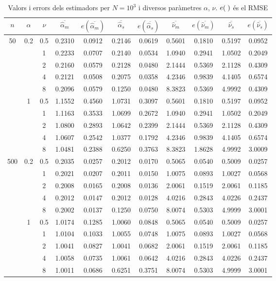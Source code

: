\documentclass[12pt, catalan]{article}
\numberwithin{table}{section}
\numberwithin{figure}{section}
\numberwithin{equation}{section}
\begin{document}
\begin{table}[h]
\centering
\caption{Valors i errors dels estimadors per $N=10^3$ i diversos paràmetres $\alpha$, $\nu$. $e(\hspace{1mm})$ és el RMSE}
\begin{tabular}{c|c|c||cc|cc||cc|cc}
$n$ & $\alpha$ & $\nu$ & $\overline{\hat{\alpha}_m}$ & $e(\overline{\hat{\alpha}_m})$ & $\overline{\hat{\alpha}_s}$ & $e(\overline{\hat{\alpha}_s})$ & $\overline{\hat{\nu}_m}$ & $e(\overline{\hat{\nu}_m})$ & $\overline{\hat{\nu}_s}$ & $e(\overline{\hat{\nu}_s})$\\\hline
\multirow{10}{*}{50} & \multirow{5}{*}{0.2} 
& 0.5 & 0.2310 & 0.0912 & 0.2146 & 0.0619 & 0.5601 & 0.1810 & 0.5197 & 0.0952\\
&& 1 & 0.2233 & 0.0707 & 0.2140 & 0.0534 & 1.0940 & 0.2941 & 1.0502 & 0.2049\\
&& 2 & 0.2160 & 0.0579 & 0.2128 & 0.0480 & 2.1444 & 0.5369 & 2.1128 & 0.4309\\
&& 4 & 0.2121 & 0.0508 & 0.2075 & 0.0358 & 4.2346 & 0.9839 & 4.1405 & 0.6574\\
&& 8 & 0.2096 & 0.0579 & 0.1250 & 0.0480 & 8.3823 & 0.5369 & 4.9992 & 0.4309\\\cline{2-11} & \multirow{5}{*}{1} 
& 0.5 & 1.1552 & 0.4560 & 1.0731 &  0.3097 & 0.5601 & 0.1810 & 0.5197 & 0.0952\\
&& 1 & 1.1163 & 0.3533 & 1.0699 & 0.2672 & 1.0940 & 0.2941 & 1.0502 & 0.2049\\
&& 2 & 1.0800 & 0.2893 & 1.0642 & 0.2399 & 2.1444 & 0.5369 & 2.1128 & 0.4309\\
&& 4 & 1.0607 & 0.2542 & 1.0377 & 0.1792 & 4.2346 & 0.9839 & 4.1405 & 0.6574\\
&& 8 & 1.0481 & 0.2388 & 0.6250 & 0.3763 & 8.3823 & 1.8628 & 4.9992 & 3.0009\\\hline\hline
\multirow{10}{*}{500} & \multirow{5}{*}{0.2}
& 0.5 & 0.2035 & 0.0257 & 0.2012 & 0.0170 & 0.5065 & 0.0540 & 0.5009 & 0.0257\\
&& 1 & 0.2021 & 0.0207 & 0.2011 & 0.0150 & 1.0075 & 0.0893 & 1.0027 & 0.0568\\
&& 2 & 0.2008 & 0.0165 & 0.2008 & 0.0136 & 2.0061 & 0.1519 & 2.0061 & 0.1185\\
&& 4 & 0.2012 & 0.0147 & 0.2012 & 0.0128 & 4.0216 & 0.2843 & 4.0226 & 0.2437\\
&& 8 & 0.2002 & 0.0137 & 0.1250 & 0.0750 & 8.0074 & 0.5303 & 4.9999 & 3.0001\\\cline{2-11} & \multirow{5}{*}{1}
& 0.5 & 1.0174 & 0.1285 & 1.0060 & 0.0848 & 0.5065 & 0.0540 & 0.5009 & 0.0257\\
&& 1 & 1.0104 & 0.1033 & 1.0055 & 0.0748 & 1.0075 & 0.0893 & 1.0027 & 0.0568\\
&& 2 & 1.0041 & 0.0827 & 1.0041 & 0.0682 & 2.0061 & 0.1519 & 2.0061 & 0.1185\\
&& 4 & 1.0058 & 0.0735 & 1.0061 & 0.0642 & 4.0216 & 0.2843 & 4.0226 & 0.2437\\
&& 8 & 1.0011 & 0.0686 & 0.6251 & 0.3751 & 8.0074 & 0.5303 & 4.9999 & 3.0001
\end{tabular}
\label{barreja}
\end{table}
\end{document}
